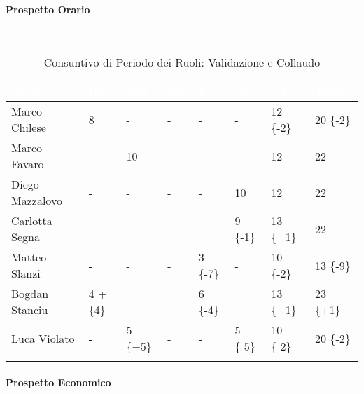 \paragraph{Prospetto Orario } ~\\
\begin{longtable}{|C{.30\textwidth}|C{.06\textwidth}|C{.06\textwidth}|C{.06\textwidth} | C{.06\textwidth}| C{.06\textwidth} | C{.06\textwidth} | C{.10\textwidth} |}
	\hline
		\textbf{\textcolor{white}{Nome}} & \textbf{\textcolor{white}{RE}} & \textbf{\textcolor{white}{AM}} & \textbf{\textcolor{white}{AN}} & \textbf{\textcolor{white}{PJ}} & \textbf{\textcolor{white}{PR}} & \textbf{\textcolor{white}{VE}} & \textbf{\textcolor{white}{Totale}}\\
	\hline 
	Marco Chilese & 8 & - & - & - & - & 12 \{-2\}& 20 \{-2\} \\
	\hline
	Marco Favaro &  - & 10 & - & - & - & 12 & 22 \\
	\hline
	Diego Mazzalovo & - & -  & - & - & 10 & 12 & 22 \\
	\hline
	Carlotta Segna & - & -  & - & - & 9 \{-1\} & 13 \{+1\} & 22 \\
	\hline
	Matteo Slanzi & - & - & - & 3 \{-7\}  & - & 10 \{-2\} & 13 \{-9\}\\
	\hline
	Bogdan Stanciu & 4 +\{4\} & - & - & 6 \{-4\} &  - & 13 \{+1\} & 23 \{+1\}\\
	\hline
	Luca Violato & - & 5 \{+5\} & - & - & 5 \{-5\} & 10 \{-2\}  & 20 \{-2\}\\   
	\hline
	
	
	\caption{Consuntivo di Periodo dei Ruoli: Validazione e Collaudo}
	\label{CP PRC}
\end{longtable}

\paragraph{Prospetto Economico} ~\\

